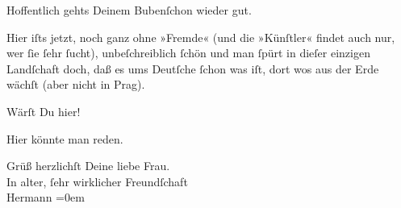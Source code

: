 \pstart
           Hoffentlich gehts Deinem Bubenſchon wieder gut.\pend
           
\pstart
           Hier iſts jetzt, noch ganz ohne »Fremde« (und die »Künſtler« findet auch nur, wer ſie
               ſehr ſucht), unbeſchreiblich ſchön und man ſpürt in dieſer einzigen Landſchaft doch,
               daß es ums Deutſche ſchon was iſt, dort wos aus der Erde wächſt (aber nicht in Prag).\pend
           
\pstart
           Wärſt Du hier!\pend
           
\pstart
           Hier könnte man reden.\pend
           
\pstart
           Grüß herzlichſt Deine liebe Frau.{\\[\baselineskip]}In alter, ſehr wirklicher Freundſchaft{\\[\baselineskip]}\spacefill\mbox{Hermann}\pend
           \leftskip=0em{}\endnumbering{}  
      